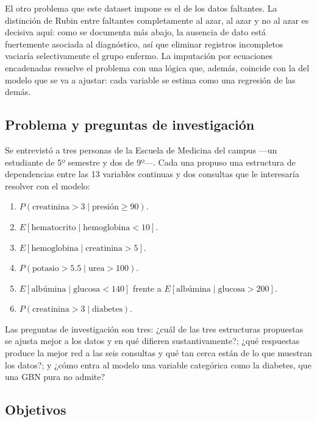 \documentclass[11pt, a4paper]{article}
\begin{document}
El otro problema que este dataset impone es el de los datos faltantes. La distinción de Rubin
\cite{rubin1976} entre faltantes completamente al azar, al azar y no al azar es decisiva aquí:
como se documenta más abajo, la ausencia de dato está fuertemente asociada al diagnóstico, así
que eliminar registros incompletos vaciaría selectivamente el grupo enfermo. La imputación por
ecuaciones encadenadas \cite{vanbuuren2011,little2002} resuelve el problema con una lógica que,
además, coincide con la del modelo que se va a ajustar: cada variable se estima como una regresión
de las demás.

\subsection{Problema y preguntas de investigación}

Se entrevistó a tres personas de la Escuela de Medicina del campus —un estudiante de 5º semestre y
dos de 9º—. Cada una propuso una estructura de dependencias entre las 13 variables continuas y dos
consultas que le interesaría resolver con el modelo:

\begin{enumerate}
    \item[\textbf{C1}] $P(\text{creatinina} > 3 \mid \text{presión} \geq 90)$.
    \item[\textbf{C2}] $E[\text{hematocrito} \mid \text{hemoglobina} < 10]$.
    \item[\textbf{C3}] $E[\text{hemoglobina} \mid \text{creatinina} > 5]$.
    \item[\textbf{C4}] $P(\text{potasio} > 5.5 \mid \text{urea} > 100)$.
    \item[\textbf{C5}] $E[\text{albúmina} \mid \text{glucosa} < 140]$ frente a
        $E[\text{albúmina} \mid \text{glucosa} > 200]$.
    \item[\textbf{C6}] $P(\text{creatinina} > 3 \mid \text{diabetes})$.
\end{enumerate}

Las preguntas de investigación son tres: ¿cuál de las tres estructuras propuestas se ajusta mejor
a los datos y en qué difieren sustantivamente?; ¿qué respuestas produce la mejor red a las seis
consultas y qué tan cerca están de lo que muestran los datos?; y ¿cómo entra al modelo una
variable categórica como la diabetes, que una GBN pura no admite?

\subsection{Objetivos}
\end{document}
